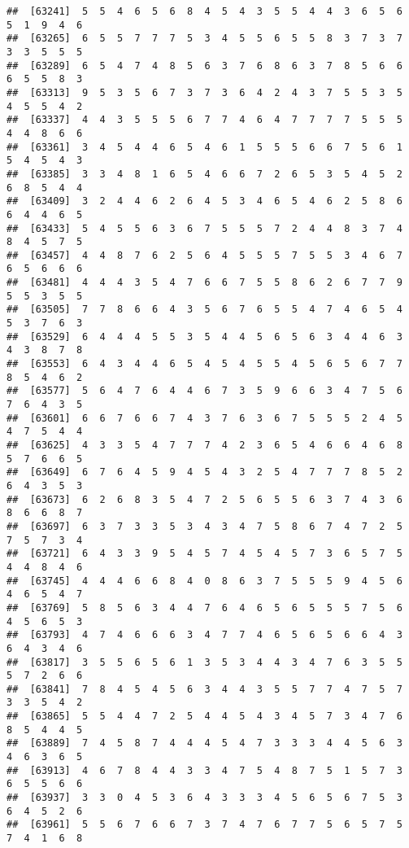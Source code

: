 \documentclass[
]{book}
\begin{document}
\begin{verbatim}
##  [63241]  5  5  4  6  5  6  8  4  5  4  3  5  5  4  4  3  6  5  6  5  1  9  4  6
##  [63265]  6  5  5  7  7  7  5  3  4  5  5  6  5  5  8  3  7  3  7  3  3  5  5  5
##  [63289]  6  5  4  7  4  8  5  6  3  7  6  8  6  3  7  8  5  6  6  6  5  5  8  3
##  [63313]  9  5  3  5  6  7  3  7  3  6  4  2  4  3  7  5  5  3  5  4  5  5  4  2
##  [63337]  4  4  3  5  5  5  6  7  7  4  6  4  7  7  7  7  5  5  5  4  4  8  6  6
##  [63361]  3  4  5  4  4  6  5  4  6  1  5  5  5  6  6  7  5  6  1  5  4  5  4  3
##  [63385]  3  3  4  8  1  6  5  4  6  6  7  2  6  5  3  5  4  5  2  6  8  5  4  4
##  [63409]  3  2  4  4  6  2  6  4  5  3  4  6  5  4  6  2  5  8  6  6  4  4  6  5
##  [63433]  5  4  5  5  6  3  6  7  5  5  5  7  2  4  4  8  3  7  4  8  4  5  7  5
##  [63457]  4  4  8  7  6  2  5  6  4  5  5  5  7  5  5  3  4  6  7  6  5  6  6  6
##  [63481]  4  4  4  3  5  4  7  6  6  7  5  5  8  6  2  6  7  7  9  5  5  3  5  5
##  [63505]  7  7  8  6  6  4  3  5  6  7  6  5  5  4  7  4  6  5  4  5  3  7  6  3
##  [63529]  6  4  4  4  5  5  3  5  4  4  5  6  5  6  3  4  4  6  3  4  3  8  7  8
##  [63553]  6  4  3  4  4  6  5  4  5  4  5  5  4  5  6  5  6  7  7  8  5  4  6  2
##  [63577]  5  6  4  7  6  4  4  6  7  3  5  9  6  6  3  4  7  5  6  7  6  4  3  5
##  [63601]  6  6  7  6  6  7  4  3  7  6  3  6  7  5  5  5  2  4  5  4  7  5  4  4
##  [63625]  4  3  3  5  4  7  7  7  4  2  3  6  5  4  6  6  4  6  8  5  7  6  6  5
##  [63649]  6  7  6  4  5  9  4  5  4  3  2  5  4  7  7  7  8  5  2  6  4  3  5  3
##  [63673]  6  2  6  8  3  5  4  7  2  5  6  5  5  6  3  7  4  3  6  8  6  6  8  7
##  [63697]  6  3  7  3  3  5  3  4  3  4  7  5  8  6  7  4  7  2  5  7  5  7  3  4
##  [63721]  6  4  3  3  9  5  4  5  7  4  5  4  5  7  3  6  5  7  5  4  4  8  4  6
##  [63745]  4  4  4  6  6  8  4  0  8  6  3  7  5  5  5  9  4  5  6  4  6  5  4  7
##  [63769]  5  8  5  6  3  4  4  7  6  4  6  5  6  5  5  5  7  5  6  4  5  6  5  3
##  [63793]  4  7  4  6  6  6  3  4  7  7  4  6  5  6  5  6  6  4  3  6  4  3  4  6
##  [63817]  3  5  5  6  5  6  1  3  5  3  4  4  3  4  7  6  3  5  5  5  7  2  6  6
##  [63841]  7  8  4  5  4  5  6  3  4  4  3  5  5  7  7  4  7  5  7  3  3  5  4  2
##  [63865]  5  5  4  4  7  2  5  4  4  5  4  3  4  5  7  3  4  7  6  8  5  4  4  5
##  [63889]  7  4  5  8  7  4  4  4  5  4  7  3  3  3  4  4  5  6  3  4  6  3  6  5
##  [63913]  4  6  7  8  4  4  3  3  4  7  5  4  8  7  5  1  5  7  3  6  5  5  6  6
##  [63937]  3  3  0  4  5  3  6  4  3  3  3  4  5  6  5  6  7  5  3  6  4  5  2  6
##  [63961]  5  5  6  7  6  6  7  3  7  4  7  6  7  7  5  6  5  7  5  7  4  1  6  8

\end{verbatim}
\end{document}
